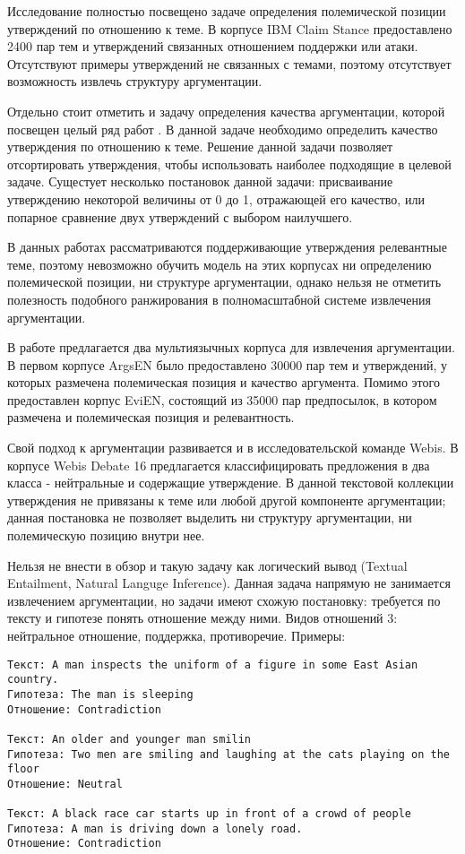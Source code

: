 Исследование \cite{bar2017stance} полностью посвещено задаче определения полемической позиции утверждений по отношению к теме. В корпусе IBM Claim Stance предоставлено 2400 пар тем и утверждений связанных отношением поддержки или атаки. Отсутствуют примеры утверждений не связанных с темами, поэтому отсутствует возможность извлечь структуру аргументации.


Отдельно стоит отметить и задачу определения качества аргументации, которой посвещен целый ряд работ \cite{gretz2020large, toledo2019automatic, gleize2019you}. В данной задаче необходимо определить качество утверждения по отношению к теме. Решение данной задачи позволяет отсортировать утверждения, чтобы использовать наиболее подходящие в целевой задаче. Сущестует несколько постановок данной задачи: присваивание утверждению некоторой величины от 0 до 1, отражающей его качество, или попарное сравнение двух утверждений с выбором наилучшего. 

В данных работах рассматриваются поддерживающие утверждения релевантные теме, поэтому невозможно обучить модель на этих корпусах ни определению полемической позиции, ни структуре аргументации, однако нельзя не отметить полезность подобного ранжирования в полномасштабной системе извлечения аргументации.

В работе \cite{toledo2020multilingual} предлагается два мультиязычных корпуса для извлечения аргументации. В первом корпусе ArgsEN было предоставлено 30000 пар тем и утверждений, у которых размечена полемическая позиция и качество аргумента. Помимо этого предоставлен корпус EviEN, состоящий из 35000 пар предпосылок, в котором размечена и полемическая позиция и релевантность.

Свой подход к аргументации развивается и в исследовательской команде Webis. В корпусе Webis Debate 16 \cite{webis16} предлагается классифицировать предложения в два класса - нейтральные и содержащие утверждение. В данной текстовой коллекции утверждения не привязаны к теме или любой другой компоненте аргументации; данная постановка не позволяет выделить ни структуру аргументации, ни полемическую позицию внутри нее.

Нельзя не внести в обзор и такую задачу как логический вывод (Textual Entailment, Natural Languge Inference). Данная задача напрямую не занимается извлечением аргументации, но задачи имеют схожую постановку: требуется по тексту и гипотезе понять отношение между ними. Видов отношений 3: нейтральное отношение, поддержка, противоречие. Примеры:
\begin{verbatim}
Текст: A man inspects the uniform of a figure in some East Asian country.
Гипотеза: The man is sleeping
Отношение: Contradiction

Текст: An older and younger man smilin
Гипотеза: Two men are smiling and laughing at the cats playing on the floor
Отношение: Neutral

Текст: A black race car starts up in front of a crowd of people
Гипотеза: A man is driving down a lonely road.
Отношение: Contradiction
\end{verbatim}

